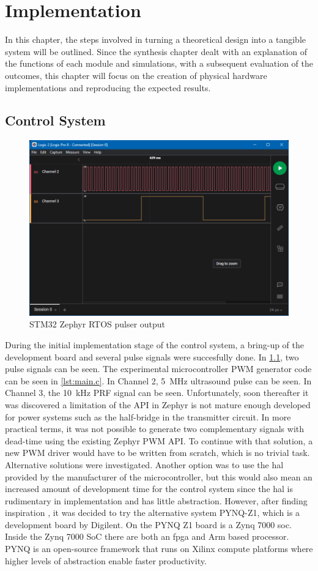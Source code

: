 \chapter{Implementation} \label{cha:Implementation} \glsresetall
In this chapter, the steps involved in turning a theoretical design into a tangible system will be outlined. Since the synthesis chapter dealt with an explanation of the functions of each module and simulations, with a subsequent evaluation of the outcomes, this chapter will focus on the creation of physical hardware implementations and reproducing the expected results.
\section{Control System}
\begin{figure}[htbp]
	\centering
	\includegraphics[width=.8\textwidth]{Figures/4_controlsystem_stm32_zephyr.png}
	\caption{STM32 Zephyr RTOS pulser output}
	\label{fig:4_stm32_zephyr_pulser}
\end{figure}
During the initial implementation stage of the control system, a bring-up of the development board and several pulse signals were succesfully done. In \cref{fig:4_stm32_zephyr_pulser}, two pulse signals can be seen. The experimental microcontroller PWM generator code can be seen in \cref{lst:main.c}. In Channel 2, \qty{5}{\mega\hertz} ultrasound pulse can be seen. In Channel 3, the \qty{10}{\kilo\hertz} PRF signal can be seen. Unfortunately, soon thereafter it was discovered a limitation of the API in Zephyr is not mature enough developed for power systems such as the half-bridge in the transmitter circuit. In more practical terms, it was not possible to generate two complementary signals with dead-time using the existing Zephyr PWM API. To continue with that solution, a new PWM driver would have to be written from scratch, which is no trivial task. Alternative solutions were investigated. Another option was to use the \gls{hal} provided by the manufacturer of the microcontroller, but this would also mean an increased amount of development time for the control system since the \gls{hal} is rudimentary in implementation and has little abstraction. However, after finding inspiration \cite{vhdl_pwm_gen}, it was decided to try the alternative system PYNQ-Z1, which is a development board by Digilent. On the PYNQ Z1 board is a Zynq 7000 \gls{soc}. Inside the Zynq 7000 SoC there are both an \gls{fpga} and Arm based processor. PYNQ is an open-source framework that runs on Xilinx compute platforms where higher levels of abstraction enable faster productivity.

